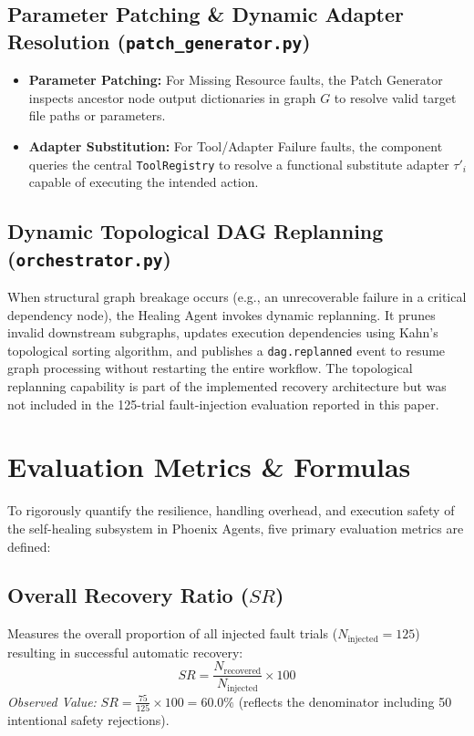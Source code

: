 \documentclass[conference]{IEEEtran}
\begin{document}
\subsection{Parameter Patching \& Dynamic Adapter Resolution (\texttt{patch\_generator.py})}
\begin{itemize}
    \item \textbf{Parameter Patching:} For Missing Resource faults, the Patch Generator inspects ancestor node output dictionaries in graph $G$ to resolve valid target file paths or parameters.
    \item \textbf{Adapter Substitution:} For Tool/Adapter Failure faults, the component queries the central \texttt{ToolRegistry} to resolve a functional substitute adapter $\tau'_i$ capable of executing the intended action.
\end{itemize}

\subsection{Dynamic Topological DAG Replanning (\texttt{orchestrator.py})}
When structural graph breakage occurs (e.g., an unrecoverable failure in a critical dependency node), the Healing Agent invokes dynamic replanning. It prunes invalid downstream subgraphs, updates execution dependencies using Kahn's topological sorting algorithm, and publishes a \texttt{dag.replanned} event to resume graph processing without restarting the entire workflow. The topological replanning capability is part of the implemented recovery architecture but was not included in the 125-trial fault-injection evaluation reported in this paper.

\section{Evaluation Metrics \& Formulas}
To rigorously quantify the resilience, handling overhead, and execution safety of the self-healing subsystem in Phoenix Agents, five primary evaluation metrics are defined:

\subsection{Overall Recovery Ratio ($SR$)}
Measures the overall proportion of all injected fault trials ($N_{\text{injected}} = 125$) resulting in successful automatic recovery:
\begin{equation}
SR = \frac{N_{\text{recovered}}}{N_{\text{injected}}} \times 100
\end{equation}
\textit{Observed Value:} $SR = \frac{75}{125} \times 100 = 60.0\%$ (reflects the denominator including 50 intentional safety rejections).
\end{document}
